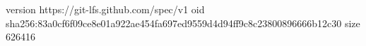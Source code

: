 version https://git-lfs.github.com/spec/v1
oid sha256:83a0cf6f09ce8e01a922ae454fa697ed9559d4d94ff9c8c23800896666b12c30
size 626416
